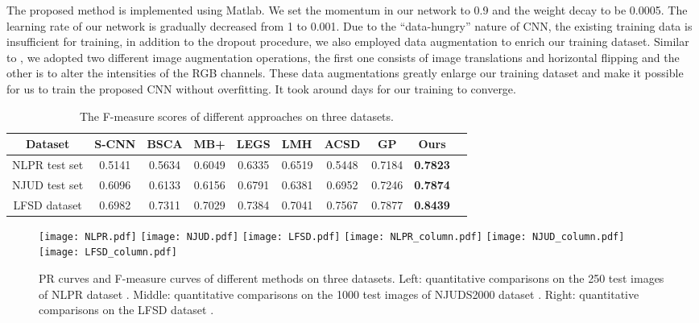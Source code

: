 \documentclass[journal]{IEEEtran}
\begin{document}
The proposed method is implemented using Matlab. We set the momentum in our network to 0.9 and the weight decay to be 0.0005. The learning rate of our network is gradually decreased from 1 to 0.001. Due to the ``data-hungry'' nature of CNN, the existing training data is insufficient for training, in addition to the dropout procedure, we also employed data augmentation to enrich our training dataset. Similar to \cite{krizhevsky2012imagenet}, we adopted two different image augmentation operations, the first one consists of image translations and horizontal flipping and the other is to alter the intensities of the RGB channels. These data augmentations greatly enlarge our training dataset and make it possible for us to train the proposed CNN without overfitting. It took around  days for our training to converge.

\begin{table*}
\centering
\caption{The F-measure scores of different approaches on three datasets.}
\label{table:belta}
\begin{tabular}{|c||c|c|c|cIc|c|c|c|}
\hline
{Dataset} & S-CNN  & BSCA  &  MB+ & LEGS & LMH & ACSD & GP & Ours \\
\hline\hline
NLPR test set & 0.5141 & 0.5634 & 0.6049 & 0.6335 & 0.6519 & 0.5448 & 0.7184 & \textbf{0.7823}\\
NJUD test set & 0.6096 & 0.6133 & 0.6156 & 0.6791 & 0.6381 & 0.6952 &0.7246 & \textbf{0.7874} \\
LFSD dataset & 0.6982 & 	0.7311&	0.7029 & 0.7384&	0.7041&	0.7567&	0.7877&	\textbf{0.8439}\\
\hline
\end{tabular}
\end{table*}
\begin{figure*}
\vspace{-3mm}
\centering
\texttt{[image: NLPR.pdf]}
\texttt{[image: NJUD.pdf]}
\texttt{[image: LFSD.pdf]}
\texttt{[image: NLPR\_column.pdf]}
\texttt{[image: NJUD\_column.pdf]}
\texttt{[image: LFSD\_column.pdf]}
\caption{PR curves and F-measure curves of different methods on three datasets. Left: quantitative comparisons on the 250 test images of NLPR dataset \cite{peng2014rgbd}. Middle: quantitative comparisons on the 1000 test images of NJUDS2000 dataset \cite{ju2014depth}. Right: quantitative comparisons on the LFSD dataset \cite{Li_2014_CVPR}.}
\label{fig:saliency_qut}
\end{figure*}
\end{document}
